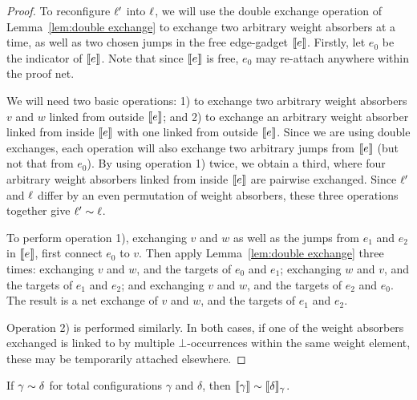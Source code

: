 \documentclass{lmcs}
\begin{document}
\begin{proof}
To reconfigure $\ell'$ into $\ell$, we will use the double exchange operation of Lemma~\ref{lem:double exchange} to exchange two arbitrary weight absorbers at a time, as well as two chosen jumps in the free edge-gadget $\llbracket e\rrbracket$.
%
Firstly, let $e_0$ be the indicator of $\llbracket e\rrbracket$.
%
Note that since $\llbracket e\rrbracket$ is free, $e_0$ may re-attach anywhere within the proof net.


We will need two basic operations: 1) to exchange two arbitrary weight absorbers $v$ and $w$ linked from outside $\llbracket e\rrbracket$; and 2) to exchange an arbitrary weight absorber linked from inside $\llbracket e\rrbracket$ with one linked from outside $\llbracket e\rrbracket$.
%
Since we are using double exchanges, each operation will also exchange two arbitrary jumps from $\llbracket e\rrbracket$ (but not that from $e_0$).
%
By using operation 1) twice, we obtain a third, where four arbitrary weight absorbers linked from inside $\llbracket e\rrbracket$ are pairwise exchanged.
%
Since $\ell'$ and $\ell$ differ by an even permutation of weight absorbers, these three operations together give $\ell'\sim\ell$.


To perform operation 1), exchanging $v$ and $w$ as well as the jumps from $e_1$ and $e_2$ in $\llbracket e\rrbracket$, first connect $e_0$ to $v$.
%
Then apply Lemma~\ref{lem:double exchange} three times: exchanging $v$ and $w$, and the targets of $e_0$ and $e_1$; exchanging $w$ and $v$, and the targets of $e_1$ and $e_2$; and exchanging $v$ and $w$, and the targets of $e_2$ and $e_0$.
%
The result is a net exchange of $v$ and $w$, and the targets of $e_1$ and $e_2$.


Operation 2) is performed similarly.
%
In both cases, if one of the weight absorbers exchanged is linked to by multiple $\bot$-occurrences within the same weight element, these may be temporarily attached elsewhere.
%
\end{proof}




\begin{lemma}
\label{lem:completeness}
If $\gamma\perm\delta$ for total configurations $\gamma$ and $\delta$, then $\itn\gamma\perm\itn\delta_\gamma$.
\end{lemma}
\end{document}
